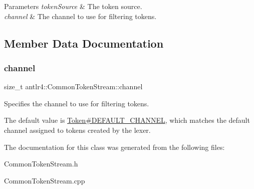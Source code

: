 \begin{DoxyParams}{Parameters}
{\em token\+Source} & The token source. \\
\hline
{\em channel} & The channel to use for filtering tokens. \\
\hline
\end{DoxyParams}


\subsection{Member Data Documentation}
\mbox{\label{classantlr4_1_1CommonTokenStream_aad59d04a125961d8ba1cffdf4a1a0bcf}} 
\subsubsection{\texorpdfstring{channel}{channel}}
{\footnotesize\ttfamily size\+\_\+t antlr4\+::\+Common\+Token\+Stream\+::channel\hspace{0.3cm}{\ttfamily [protected]}}

Specifies the channel to use for filtering tokens.

The default value is \hyperlink{classantlr4_1_1Token_a699cbc56affbddc079561e175cba8435}{Token\#\+D\+E\+F\+A\+U\+L\+T\+\_\+\+C\+H\+A\+N\+N\+EL}, which matches the default channel assigned to tokens created by the lexer.

The documentation for this class was generated from the following files\+:\begin{DoxyCompactItemize}
\item 
Common\+Token\+Stream.\+h\item 
Common\+Token\+Stream.\+cpp\end{DoxyCompactItemize}
